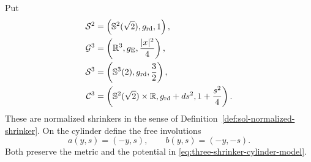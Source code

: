 \documentclass[10pt]{coll-l}
\newcommand{\R}{\mathbb{R}}
\newcommand{\Sph}{\mathbb{S}}
\theoremstyle{definition}
\theoremstyle{remark}
\numberwithin{section}{chapter}
\numberwithin{equation}{chapter}
\begin{document}
Put
\begin{align}
 \mathcal S^2
   &=\left(\Sph^2(\sqrt2),g_{\rm rd},1\right),
                                                               \label{eq:two-shrinker-sphere-model}\\
 \mathcal G^3
   &=\left(\R^3,g_{\rm E},\frac{|x|^2}{4}\right),
                                                               \label{eq:three-shrinker-gaussian-model}\\
 \mathcal S^3
   &=\left(\Sph^3(2),g_{\rm rd},\frac32\right),
                                                               \label{eq:three-shrinker-sphere-model}\\
 \mathcal C^3
   &=\left(\Sph^2(\sqrt2)\times\R,
             g_{\rm rd}+ds^2,1+\frac{s^2}{4}\right).
                                                               \label{eq:three-shrinker-cylinder-model}
\end{align}
These are normalized shrinkers in the sense of
Definition~\ref{def:sol-normalized-shrinker}.  On the cylinder define the
free involutions
\begin{equation}
       a(y,s)=(-y,s),
       \qquad
       b(y,s)=(-y,-s).                                   \label{eq:three-shrinker-cylinder-involutions}
\end{equation}
Both preserve the metric and the potential in
\eqref{eq:three-shrinker-cylinder-model}.
\end{document}
